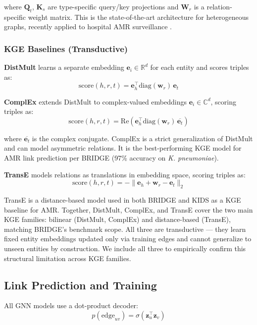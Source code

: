 \documentclass[conference]{IEEEtran}
\begin{document}
where $\mathbf{Q}_t$, $\mathbf{K}_s$ are type-specific query/key projections and $\mathbf{W}_r$ is a relation-specific weight matrix. This is the state-of-the-art architecture for heterogeneous graphs, recently applied to hospital AMR surveillance \cite{vre2025}.

\subsubsection{KGE Baselines (Transductive)}

\textbf{DistMult} \cite{yang2015embedding} learns a separate embedding $\mathbf{e}_i \in \mathbb{R}^d$ for each entity and scores triples as:
$$\text{score}(h, r, t) = \mathbf{e}_h^\top \text{diag}(\mathbf{w}_r) \, \mathbf{e}_t$$

\textbf{ComplEx} \cite{trouillon2016complex} extends DistMult to complex-valued embeddings $\mathbf{e}_i \in \mathbb{C}^d$, scoring triples as:
$$\text{score}(h, r, t) = \text{Re}(\mathbf{e}_h^\top \text{diag}(\mathbf{w}_r) \, \overline{\mathbf{e}_t})$$

where $\overline{\mathbf{e}_t}$ is the complex conjugate. ComplEx is a strict generalization of DistMult and can model asymmetric relations. It is the best-performing KGE model for AMR link prediction per BRIDGE \cite{bessadok2026bridge} (97\% accuracy on \textit{K. pneumoniae}).

\textbf{TransE} \cite{bordes2013translating} models relations as translations in embedding space, scoring triples as:
$$\text{score}(h, r, t) = -\|\mathbf{e}_h + \mathbf{w}_r - \mathbf{e}_t\|_2$$

TransE is a distance-based model used in both BRIDGE \cite{bessadok2026bridge} and KIDS \cite{youn2022kids} as a KGE baseline for AMR. Together, DistMult, ComplEx, and TransE cover the two main KGE families: bilinear (DistMult, ComplEx) and distance-based (TransE), matching BRIDGE's benchmark scope. All three are transductive --- they learn fixed entity embeddings updated only via training edges and cannot generalize to unseen entities by construction. We include all three to empirically confirm this structural limitation across KGE families.

\subsection{Link Prediction and Training}

All GNN models use a dot-product decoder:
$$p(\text{edge}_{uv}) = \sigma(\mathbf{z}_u^\top \mathbf{z}_v)$$
\end{document}
